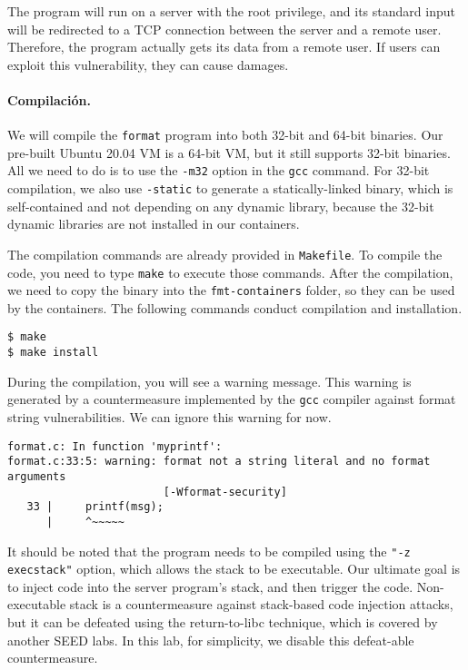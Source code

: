 The program will run on a server with the root privilege, and its
standard input will be redirected to a TCP connection between the
server and a remote user.
Therefore, the program actually gets its data from a remote user.
If users can exploit this vulnerability, they can cause damages.


\paragraph{Compilación.} 
We will compile the \texttt{format} program into both 32-bit and 64-bit
binaries. Our pre-built Ubuntu 20.04 VM is a 64-bit VM, but it
still supports 32-bit binaries. All we need to do is to
use the \texttt{-m32} option in the \texttt{gcc} command.
For 32-bit compilation, we also use \texttt{-static} to generate
a statically-linked binary, which is self-contained and not depending
on any dynamic library, because the 32-bit dynamic libraries
are not installed in our containers.

The compilation commands are already provided in \texttt{Makefile}. To compile
the code, you need to type \texttt{make} to execute those commands.
After the compilation, we need to copy the binary into
the \texttt{fmt-containers} folder, so they can be used by the
containers. The following commands conduct compilation and
installation.

\begin{lstlisting}
$ make
$ make install
\end{lstlisting}


During the compilation, you will see a
warning message. This warning is generated by a countermeasure implemented by
the \texttt{gcc} compiler against format string vulnerabilities. We can
ignore this warning for now. 

\begin{lstlisting}
format.c: In function 'myprintf':
format.c:33:5: warning: format not a string literal and no format arguments
                        [-Wformat-security]
   33 |     printf(msg);
      |     ^~~~~~
\end{lstlisting}

It should be noted that the program needs to be compiled using 
the \texttt{"-z execstack"} option, which allows the stack to be 
executable. Our ultimate goal is to inject code into the 
server program's stack, and then trigger the code. 
Non-executable stack is a countermeasure against stack-based 
code injection attacks, but 
it can be defeated using the return-to-libc technique, which 
is covered by another SEED labs. In this lab, for simplicity,
we disable this defeat-able countermeasure. 


